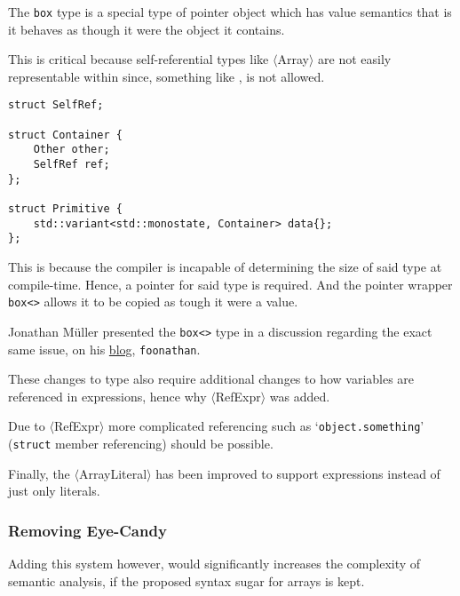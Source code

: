 The \texttt{box} type is a special type of pointer
object which has value semantics that is it behaves
as though it were the object it contains.

This is critical because self-referential types like
$\langle$Array$\rangle$ are not easily representable within
\CC{} since, something like , is not
allowed.

\begin{lstlisting}[caption={An size unbounded type in \CC{}
(parl/Core.hpp).}, label=lst:unboundedsize]
struct SelfRef;

struct Container {
    Other other;
    SelfRef ref;
};

struct Primitive {
    std::variant<std::monostate, Container> data{};
};
\end{lstlisting}

This is because the \CC{} compiler is incapable of determining
the size of said type at compile-time. Hence, a pointer for said
type is required. And the pointer wrapper \texttt{box<>} allows
it to be copied as tough it were a value.

\begin{attrib}
    \textcolor{UMRed}{Jonathan Müller} presented the
    \texttt{box<>} type in a discussion regarding the exact same
    issue, on his
    \href{https://www.foonathan.net/2022/05/recursive-variant-box/}{
    blog}, \texttt{foonathan}.
\end{attrib}

These changes to type also require additional changes to how
variables are referenced in expressions, hence why
$\langle$RefExpr$\rangle$ was added.

\begin{todo}
Due to $\langle$RefExpr$\rangle$ more complicated referencing
such as `\texttt{object.something}' (\texttt{struct} member
referencing) should be possible.
\end{todo}

Finally, the $\langle$ArrayLiteral$\rangle$ has been improved to
support expressions instead of just only literals.

\subsubsection{Removing Eye-Candy}\label{eyecandy}

Adding this system however, would significantly increases the
complexity of semantic analysis, if the proposed syntax sugar
for arrays is kept.

